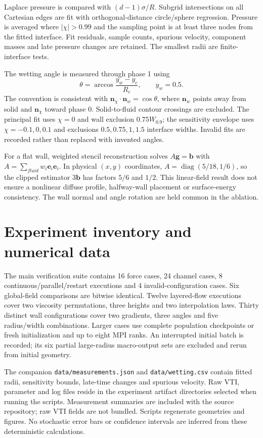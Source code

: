 \documentclass[11pt]{article}
\begin{document}
Laplace pressure is compared with $(d-1)\sigma/R$. Subgrid intersections
on all Cartesian edges are fit with orthogonal-distance circle/sphere
regression. Pressure is averaged where $|\chi|>0.99$ and the sampling point
is at least three nodes from the fitted interface. Fit residuals, sample
counts, spurious velocity, component masses and late pressure changes are
retained. The smallest radii are finite-interface tests.

The wetting angle is measured through phase 1 using
\begin{equation}
 \theta=\arccos\frac{y_w-y_c}{R_c},\qquad y_w=0.5.
\end{equation}
The convention is consistent with $\bm n_\chi\cdot\bm n_w=\cos\theta$,
where $\bm n_w$ points away from solid and $\bm n_\chi$ toward phase 0.
Solid-to-fluid contour crossings are excluded. The principal fit uses
$\chi=0$ and wall exclusion $0.75W_{0.9}$; the sensitivity envelope uses
$\chi=-0.1,0,0.1$ and exclusions $0.5,0.75,1,1.5$ interface widths.
Invalid fits are recorded rather than replaced with invented angles.

For a flat wall, weighted stencil reconstruction solves
$A\bm g=\bm b$ with $A=\sum_{fluid}w_i\bm e_i\bm e_i$.
In physical $(x,y)$ coordinates, $A=\operatorname{diag}(5/18,1/6)$, so
the clipped estimator $3\bm b$ has factors $5/6$ and $1/2$.
This linear-field result does not ensure a nonlinear diffuse profile,
halfway-wall placement or surface-energy consistency. The wall normal and
angle rotation are held common in the ablation.

\section{Experiment inventory and numerical data}
The main verification suite contains 16 force cases, 24 channel cases,
8 continuous/parallel/restart executions and 4 invalid-configuration cases.
Six global-field comparisons are bitwise identical. Twelve layered-flow
executions cover two viscosity permutations, three heights and two
interpolation laws. Thirty distinct wall configurations cover two gradients,
three angles and five radius/width combinations. Larger cases use complete
population checkpoints or fresh initialization and up to eight MPI ranks.
An interrupted initial batch is recorded; its six partial large-radius
macro-output sets are excluded and rerun from initial geometry.



The companion \texttt{data/measurements.json} and \texttt{data/wetting.csv}
contain fitted radii, sensitivity bounds, late-time changes and spurious
velocity. Raw VTI, parameter and log files reside in the experiment artifact
directories selected when running the scripts. Measurement summaries are
included with the source repository; raw VTI fields are not bundled. Scripts regenerate
geometries and figures. No stochastic error bars or confidence intervals
are inferred from these deterministic calculations.
\end{document}
